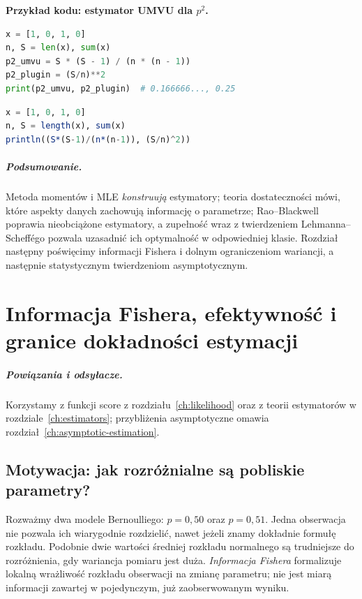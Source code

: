 \documentclass[11pt,a4paper,oneside]{report}
\numberwithin{equation}{chapter}
\theoremstyle{plain}
\theoremstyle{definition}
\theoremstyle{remark}
\begin{document}
\noindent\textbf{Przykład kodu: estymator UMVU dla $p^2$.}\par
\par
{}
\smallskip
\begin{lstlisting}[language=Python,caption={UMVU dla kwadratu prawdopodobieństwa sukcesu (Python).}]
x = [1, 0, 1, 0]
n, S = len(x), sum(x)
p2_umvu = S * (S - 1) / (n * (n - 1))
p2_plugin = (S/n)**2
print(p2_umvu, p2_plugin)  # 0.166666..., 0.25
\end{lstlisting}
\par
{}
\smallskip
\begin{lstlisting}[language=Julia,caption={UMVU dla kwadratu prawdopodobieństwa sukcesu (Julia).}]
x = [1, 0, 1, 0]
n, S = length(x), sum(x)
println((S*(S-1)/(n*(n-1)), (S/n)^2))
\end{lstlisting}

\paragraph{Podsumowanie.}
Metoda momentów i MLE \emph{konstruują} estymatory; teoria
dostateczności mówi, które aspekty danych zachowują informację
o parametrze; Rao--Blackwell poprawia nieobciążone estymatory,
a zupełność wraz z twierdzeniem Lehmanna--Scheffégo pozwala
uzasadnić ich optymalność w odpowiedniej klasie. Rozdział następny
poświęcimy informacji Fishera i dolnym ograniczeniom wariancji,
a następnie statystycznym twierdzeniom asymptotycznym.


\chapter{Informacja Fishera, efektywność i granice dokładności estymacji}
\label{ch:fisher-information}
\paragraph{Powiązania i odsyłacze.} Korzystamy z funkcji score z rozdziału~\ref{ch:likelihood} oraz z teorii estymatorów w rozdziale~\ref{ch:estimators}; przybliżenia asymptotyczne omawia rozdział~\ref{ch:asymptotic-estimation}.


\section{Motywacja: jak rozróżnialne są pobliskie parametry?}
Rozważmy dwa modele Bernoulliego: $p=0{,}50$ oraz $p=0{,}51$.
Jedna obserwacja nie pozwala ich wiarygodnie rozdzielić, nawet jeżeli
znamy dokładnie formułę rozkładu. Podobnie dwie wartości średniej
rozkładu normalnego są trudniejsze do rozróżnienia, gdy wariancja
pomiaru jest duża. \emph{Informacja Fishera} formalizuje lokalną
wrażliwość rozkładu obserwacji na zmianę parametru; nie jest miarą
informacji zawartej w pojedynczym, już zaobserwowanym wyniku.
\end{document}
